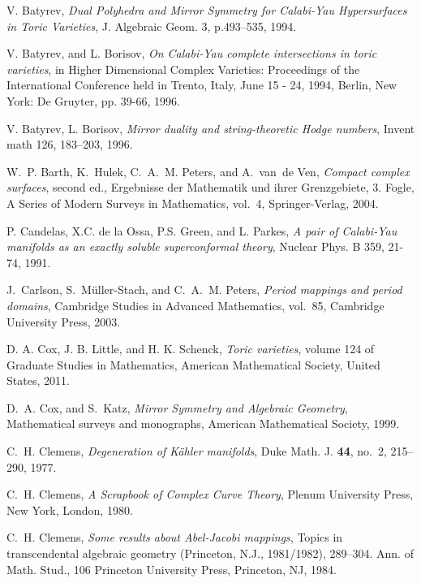\documentclass{article}
\numberwithin{equation}{section}
\begin{document}
 
\begin{thebibliography}{70}


V. Batyrev, \emph{Dual Polyhedra and Mirror Symmetry for Calabi-Yau Hypersurfaces in Toric Varieties}, J. Algebraic Geom. 3, p.493–535, 1994.



V. Batyrev, and L. Borisov,  \emph{On Calabi-Yau complete intersections in toric varieties}, in Higher Dimensional Complex Varieties: Proceedings of the International Conference held in Trento, Italy, June 15 - 24, 1994, Berlin, New York: De Gruyter, pp. 39-66, 1996.


V. Batyrev, L. Borisov, \emph{Mirror duality and string-theoretic Hodge numbers}, Invent math 126, 183–203, 1996.


W.~P. Barth, K.~Hulek, C.~A.~M. Peters, and A.~van~de Ven, \emph{Compact
  complex surfaces}, second ed., Ergebnisse der Mathematik und ihrer
  Grenzgebiete, 3. Fogle, A Series of Modern Surveys in Mathematics, vol.~4,
  Springer-Verlag, 2004.


P. Candelas, X.C. de la Ossa, P.S. Green, and L. Parkes, 
\emph{A pair of Calabi-Yau manifolds as an exactly soluble superconformal theory}, Nuclear Phys. B 359, 21-74, 1991.
  
J.~Carlson, S.~M{\"u}ller-Stach, and C.~A.~M. Peters, \emph{Period mappings and
  period domains}, Cambridge Studies in Advanced Mathematics, vol.~85,
  Cambridge University Press, 2003.



D. A. Cox, J. B. Little, and H. K. Schenck, \emph{Toric varieties}, volume 124 of Graduate Studies in Mathematics, American Mathematical Society, United States, 2011.

  
D.~A. Cox, and S.~Katz, 
\emph{Mirror Symmetry and Algebraic Geometry},
  Mathematical surveys and monographs,
  American Mathematical Society, 1999.


C.~H. Clemens, \emph{Degeneration of {K}{\"a}hler manifolds}, Duke Math. J.
  \textbf{44}, no.~2, 215--290, 1977.


C.~H. Clemens, \emph{A Scrapbook of Complex Curve Theory}, Plenum University Press, New York, London, 1980.


C.~H. Clemens, \emph{Some results about Abel-Jacobi mappings}, Topics in transcendental algebraic geometry (Princeton, N.J., 1981/1982), 289–304. Ann. of Math. Stud., 106 Princeton University Press, Princeton, NJ, 1984.



\end{thebibliography}
\end{document}
